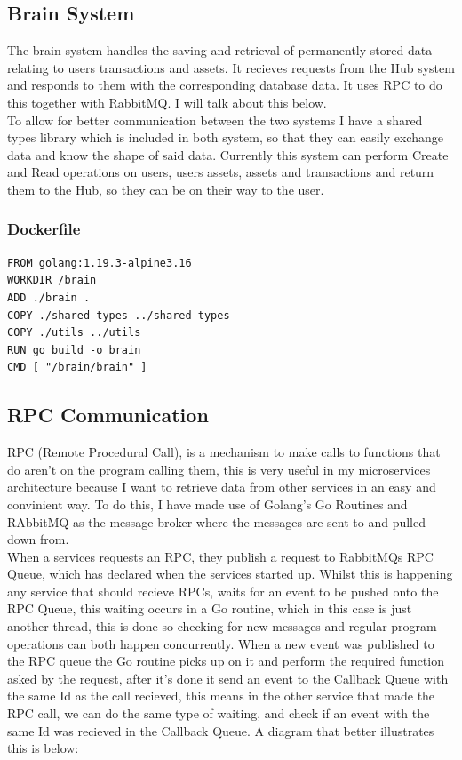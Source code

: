 \documentclass[titlepage]{article}
\begin{document}
\subsection{Brain System}
The brain system handles the saving and retrieval of permanently stored data relating to users transactions and assets. It recieves requests from the Hub system and responds to them with the corresponding database data. It uses RPC to do this together with RabbitMQ. I will talk about this below. \\

To allow for better communication between the two systems I have a shared types library which is included in both system, so that they can easily exchange data and know the shape of said data. Currently this system can perform Create and Read operations on users, users assets, assets and transactions and return them to the Hub, so they can be on their way to the user.

\subsubsection{Dockerfile}
\begin{verbatim}
FROM golang:1.19.3-alpine3.16
WORKDIR /brain
ADD ./brain .
COPY ./shared-types ../shared-types
COPY ./utils ../utils
RUN go build -o brain
CMD [ "/brain/brain" ]
\end{verbatim}

\subsection{RPC Communication}
RPC (Remote Procedural Call), is a mechanism to make calls to functions that do aren't on the program calling them, this is very useful in my microservices architecture because I want to retrieve data from other services in an easy and convinient way. To do this, I have made use of Golang's Go Routines and RAbbitMQ as the message broker where the messages are sent to and pulled down from. \\

When a services requests an RPC, they publish a request to RabbitMQs RPC Queue, which has declared when the services started up. Whilst this is happening any service that should recieve RPCs, waits for an event to be pushed onto the RPC Queue, this waiting occurs in a Go routine, which in this case is just another thread, this is done so checking for new messages and regular program operations can both happen concurrently. When a new event was published to the RPC queue the Go routine picks up on it and perform the required function asked by the request, after it's done it send an event to the Callback Queue with the same Id as the call recieved, this means in the other service that made the RPC call, we can do the same type of waiting, and check if an event with the same Id was recieved in the Callback Queue. A diagram that better illustrates this is below:
\end{document}
